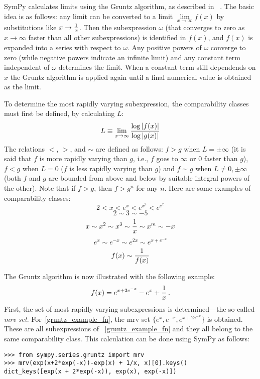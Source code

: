 SymPy calculates limits using the Gruntz algorithm, as described in%
~\cite{Gruntz1996limits}. The basic idea is as follows: any limit can be
converted to a limit $\lim\limits_{x\to\infty} f(x)$ by substitutions like
$x\to{1\over x}$. Then the subexpression $\omega$ (that converges
to zero as $x\to\infty$ faster than all other subexpressions) is identified in
$f(x)$, and $f(x)$ is expanded into a series with respect to $\omega$. Any
positive powers of $\omega$ converge to zero (while negative powers indicate
an infinite limit) and any constant term independent of
$\omega$ determines the limit. When a constant term still dependends on
$x$ the Gruntz algorithm is applied again until a final numerical value
is obtained as the limit.

To determine the most rapidly varying subexpression, the comparability classes
must first be defined, by calculating $L$:
\begin{equation}
L\equiv \lim_{x\to\infty} {\log |f(x)| \over \log |g(x)|}
\end{equation}
The relations $<$, $>$, and $\sim$ are defined as follows: $f>g$ when
$L=\pm\infty$ (it is said that $f$ is more rapidly varying than $g$, i.e., $f$
goes to $\infty$ or $0$ faster than $g$), $f<g$ when $L=0$ ($f$ is less
rapidly varying than $g$) and $f\sim g$ when $L\neq 0,\pm\infty$ (both $f$ and
$g$ are bounded from above and below by suitable integral powers of the
other). Note that if $f > g$, then $f > g^n$ for any $n$. Here
are some examples of comparability classes:
\[2 < x < e^x < e^{x^2} < e^{e^x}\]
\[2\sim 3\sim -5\]
\[x\sim x^2\sim x^3\sim {1\over x}\sim x^m\sim -x\]
\[e^x\sim e^{-x}\sim e^{2x}\sim e^{x+e^{-x}}\]
\[f(x)\sim{1\over f(x)}\]

The Gruntz algorithm is now illustrated with the following example:
\begin{equation}
    \label{gruntz_example_fn}
f(x) = e^{x+2e^{-x}} - e^x + {1\over x} \,.
\end{equation}
First, the set of most rapidly varying subexpressions is determined---the
so-called \textit{mrv set}. For~\eqref{gruntz_example_fn}, the mrv set
$\{e^x, e^{-x}, e^{x+2e^{-x}}\}$ is obtained. These are all subexpressions of%
~\eqref{gruntz_example_fn} and they all belong to the same comparability
class. This calculation can be done using SymPy as follows:

\begin{verbatim}
>>> from sympy.series.gruntz import mrv
>>> mrv(exp(x+2*exp(-x))-exp(x) + 1/x, x)[0].keys()
dict_keys([exp(x + 2*exp(-x)), exp(x), exp(-x)])
\end{verbatim}

